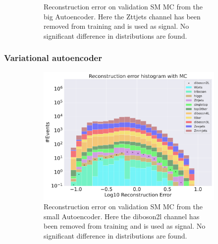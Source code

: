 \begin{figure}[h!]
\begin{subfigure}{.45\textwidth}
        \caption{Reconstruction error on validation SM MC from the big Autoencoder. Here the Zttjets channel has been removed from training and 
        is used as signal. No significant difference in distributions are found. }
        \label{fig:ae_big_Zttjets}
    \end{subfigure}
    \hfill  
    \caption{ }
    \label{fig:ae_big_channel5}
\end{figure}

\subsubsection*{Variational autoencoder}

\begin{figure}[h!]
    \centering
    \begin{subfigure}{.45\textwidth}
        \includegraphics[width=\textwidth]{Figures/VAE_testing/small/b_data_recon_big_rm3_feats_sig_diboson2l.pdf}
        \caption{Reconstruction error on validation SM MC from the small Autoencoder. Here the diboson2l channel has been removed from training and 
        is used as signal. No significant difference in distributions are found.}
        \label{fig:vae_small_diboson2l}
    \end{subfigure}
    \hfill 
    \begin{subfigure}{.45\textwidth}

\end{subfigure}
\end{figure}
